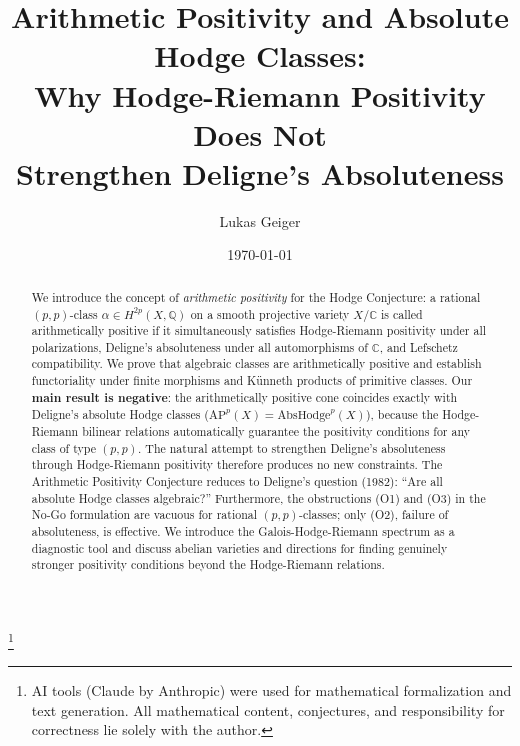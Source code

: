 \documentclass[aps,prd,twocolumn,superscriptaddress,nofootinbib]{revtex4-2}
\theoremstyle{definition}
\theoremstyle{remark}
\begin{document}

\title{Arithmetic Positivity and Absolute Hodge Classes:\\Why Hodge-Riemann Positivity Does Not\\Strengthen Deligne's Absoluteness}

\author{Lukas Geiger}

\date{\today}

\begin{abstract}
We introduce the concept of \textit{arithmetic positivity} for the Hodge Conjecture: a rational $(p,p)$-class $\alpha \in H^{2p}(X, \mathbb{Q})$ on a smooth projective variety $X/\mathbb{C}$ is called arithmetically positive if it simultaneously satisfies Hodge-Riemann positivity under all polarizations, Deligne's absoluteness under all automorphisms of $\mathbb{C}$, and Lefschetz compatibility. We prove that algebraic classes are arithmetically positive and establish functoriality under finite morphisms and K\"unneth products of primitive classes. Our \textbf{main result is negative}: the arithmetically positive cone coincides exactly with Deligne's absolute Hodge classes ($\mathrm{AP}^p(X) = \mathrm{AbsHodge}^p(X)$), because the Hodge-Riemann bilinear relations automatically guarantee the positivity conditions for any class of type $(p,p)$. The natural attempt to strengthen Deligne's absoluteness through Hodge-Riemann positivity therefore produces no new constraints. The Arithmetic Positivity Conjecture reduces to Deligne's question (1982): ``Are all absolute Hodge classes algebraic?'' Furthermore, the obstructions (O1) and (O3) in the No-Go formulation are vacuous for rational $(p,p)$-classes; only (O2), failure of absoluteness, is effective. We introduce the Galois-Hodge-Riemann spectrum as a diagnostic tool and discuss abelian varieties and directions for finding genuinely stronger positivity conditions beyond the Hodge-Riemann relations.
\end{abstract}


\thanks{AI tools (Claude by Anthropic) were used for mathematical formalization and text generation. All mathematical content, conjectures, and responsibility for correctness lie solely with the author.}
\end{document}
